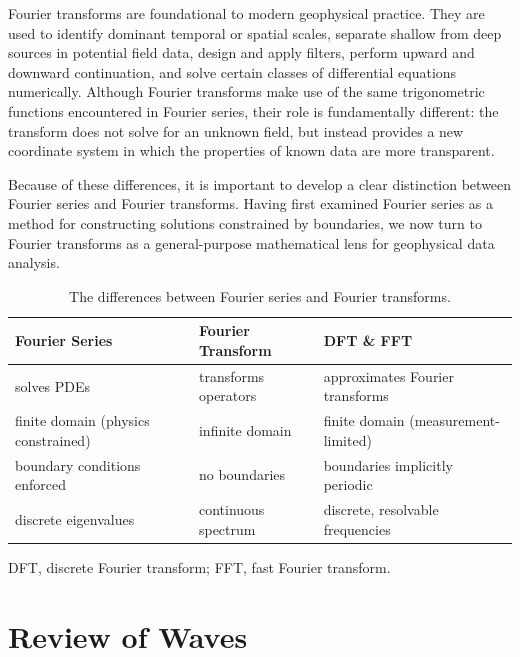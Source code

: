 Fourier transforms are foundational to modern geophysical practice. They are used to identify dominant temporal or spatial scales, separate shallow from deep sources in potential field data, design and apply filters, perform upward and downward continuation, and solve certain classes of differential equations numerically. Although Fourier transforms make use of the same trigonometric functions encountered in Fourier series, their role is fundamentally different: the transform does not solve for an unknown field, but instead provides a new coordinate system in which the properties of known data are more transparent.

Because of these differences, it is important to develop a clear distinction between Fourier series and Fourier transforms. Having first examined Fourier series as a method for constructing solutions constrained by boundaries, we now turn to Fourier transforms as a general-purpose mathematical lens for geophysical data analysis.
\begin{table}[htbp]
    \centering
    \begin{threeparttable}
    \caption{The differences between Fourier series and Fourier transforms.}
    \label{tab:fs_v_ft}
    \begin{tabular}{@{}lll@{}}
        \toprule
        \textbf{Fourier Series} & \textbf{Fourier Transform} & \textbf{DFT} \& \textbf{FFT}\tnote{a}\\
        \midrule
        solves PDEs & transforms operators & approximates Fourier transforms \\
        finite domain (physics constrained) & infinite domain & finite domain (measurement-limited) \\
        boundary conditions enforced & no boundaries & boundaries implicitly periodic \\
        discrete eigenvalues & continuous spectrum & discrete, resolvable frequencies \\
        \bottomrule
    \end{tabular}
    \begin{tablenotes}
        \item[a] DFT, discrete Fourier transform; FFT, fast Fourier transform.
    \end{tablenotes}
    \end{threeparttable}
\end{table}


\section{Review of Waves}

